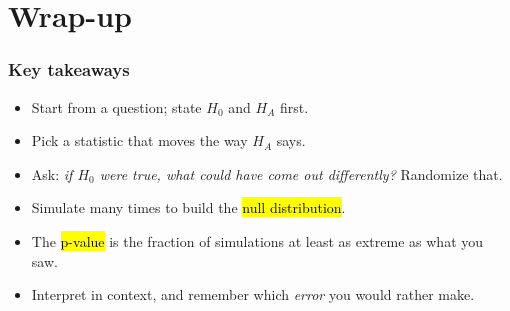 \documentclass[slidestop,compress,mathserif]{beamer}
\begin{document}
\section{Wrap-up}
\begin{frame}
\frametitle{Key takeaways}

\begin{itemize}
\item Start from a question; state $H_0$ and $H_A$ first.
\item Pick a statistic that moves the way $H_A$ says.
\item Ask: \emph{if $H_0$ were true, what could have come out differently?} Randomize that.
\item Simulate many times to build the \hl{null distribution}.
\item The \hl{p-value} is the fraction of simulations at least as extreme as what you saw.
\item Interpret in context, and remember which \emph{error} you would rather make.
\end{itemize}

\vspace{-0.1em}

\end{frame}

\end{document}
